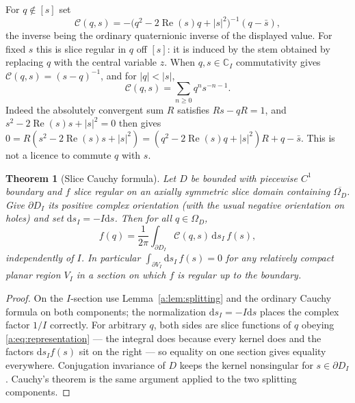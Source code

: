 \documentclass[11pt,a4paper]{article}
\numberwithin{equation}{section}
\newtheorem{theorem}{Theorem}[section]
\theoremstyle{definition}
\theoremstyle{remark}
\theoremstyle{plain}
\newcommand{\CC}{\mathbb C}
\DeclareMathOperator{\Rea}{Re}
\newcommand{\Om}{\Omega}
\newcommand{\abs}[1]{\lvert #1\rvert}
\newcommand{\dd}{\mathrm d}
\begin{document}
For $q\notin[s]$ set
\begin{equation}
 \mathcal C(q,s)=-\bigl(q^2-2\Rea(s)q+\abs s^2\bigr)^{-1}(q-\bar s),
 \label{a:eq:kernel}
\end{equation}
the inverse being the ordinary quaternionic inverse of the displayed value.
For fixed $s$ this is slice regular in $q$ off $[s]$: it is induced by the
stem obtained by replacing $q$ with the central variable $z$. When
$q,s\in\CC_I$ commutativity gives $\mathcal C(q,s)=(s-q)^{-1}$, and for
$\abs q<\abs s$,
\begin{equation}
 \mathcal C(q,s)=\sum_{n\ge0}q^ns^{-n-1}.
 \label{a:eq:kernelseries}
\end{equation}
Indeed the absolutely convergent sum $R$ satisfies $Rs-qR=1$, and
$s^2-2\Rea(s)s+\abs s^2=0$ then gives
$0=R(s^2-2\Rea(s)s+\abs s^2)=(q^2-2\Rea(s)q+\abs s^2)R+q-\bar s$. This is not
a licence to commute $q$ with $s$.

\begin{theorem}[Slice Cauchy formula]
\label{a:thm:cauchy-slice}
Let $D$ be bounded with piecewise $C^1$ boundary and $f$ slice regular on an
axially symmetric slice domain containing $\overline{\Om_D}$. Give
$\partial D_I$ its positive complex orientation (with the usual negative
orientation on holes) and set $\dd s_I=-I\dd s$. Then for all $q\in\Om_D$,
\begin{equation}
 f(q)=\frac1{2\pi}\int_{\partial D_I}\mathcal C(q,s)\,\dd s_I\,f(s),
 \label{a:eq:cauchy-slice}
\end{equation}
independently of $I$. In particular
$\int_{\partial V_I}\dd s_I\,f(s)=0$ for any relatively compact planar region
$V_I$ in a section on which $f$ is regular up to the boundary.
\end{theorem}

\begin{proof}
On the $I$-section use Lemma~\ref{a:lem:splitting} and the ordinary Cauchy
formula on both components; the normalization $\dd s_I=-I\dd s$ places the
complex factor $1/I$ correctly. For arbitrary $q$, both sides are slice
functions of $q$ obeying \eqref{a:eq:representation} --- the integral does
because every kernel does and the factors $\dd s_I f(s)$ sit on the right ---
so equality on one section gives equality everywhere. Conjugation invariance
of $D$ keeps the kernel nonsingular for $s\in\partial D_I$. Cauchy's theorem
is the same argument applied to the two splitting components.
\end{proof}
\end{document}
